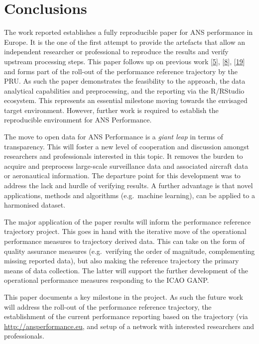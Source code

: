 \documentclass[conference,final,a4paper,]{IEEEtran}
\begin{document}
\hypertarget{conclusions}{%
\section{Conclusions}\label{conclusions}}

The work reported establishes a fully reproducible paper for ANS performance in Europe.
It is the one of the first attempt to provide the artefacts that allow an independent researcher or professional to reproduce the results and verify upstream processing steps.
This paper follows up on previous work {[}\protect\hyperlink{ref-spinielli_2018}{5}{]}, {[}\protect\hyperlink{ref-koelle_open_2017}{8}{]}, {[}\protect\hyperlink{ref-spinielli_2017}{19}{]} and forms part of the roll-out of the performance reference trajectory by the PRU.
As such the paper demonstrates the feasibility to the approach, the data analytical capabilities and preprocessing, and the reporting via the R/RStudio ecosystem.
This represents an essential milestone moving towards the envisaged target environment.
However, further work is required to establish the reproducible environment for ANS Performance.

The move to open data for ANS Performance is a \emph{giant leap} in terms of transparency.
This will foster a new level of cooperation and discussion amongst researchers and professionals interested in this topic.
It removes the burden to acquire and preprocess large-scale surveillance data and associated aircraft data or aeronautical information.
The departure point for this development was to address the lack and hurdle of verifying results.
A further advantage is that novel applications, methods and algorithms (e.g.~machine learning), can be applied to a harmonised dataset.

The major application of the paper results will inform the performance reference trajectory project.
This goes in hand with the iterative move of the operational performance measures to trajectory derived data.
This can take on the form of quality assurance measures (e.g.~verifying the order of magnitude, complementing missing reported data), but also making the reference trajectory the primary means of data collection.
The latter will support the further development of the operational performance measures responding to the ICAO GANP.

This paper documents a key milestone in the project.
As such the future work will address the roll-out of the performance reference trajectory,
the establishment of the current performance reporting based on the trajectory (via \url{http://ansperformance.eu}, and setup of a network with interested researchers and professionals.
\end{document}
